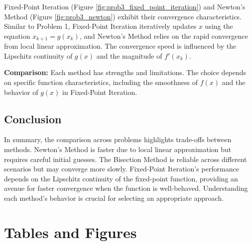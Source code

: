 \documentclass[12pt, letterpaper]{article}
\begin{document}
Fixed-Point Iteration (Figure \ref{fig:prob3_fixed_point_iteration}) and Newton's Method (Figure \ref{fig:prob3_newton}) exhibit their convergence characteristics. Similar to Problem 1, Fixed-Point Iteration iteratively updates \(x\) using the equation \(x_{k+1} = g(x_k)\), and Newton's Method relies on the rapid convergence from local linear approximation. The convergence speed is influenced by the Lipschitz continuity of \(g(x)\) and the magnitude of \(f'(x_k)\).

\textbf{Comparison:} Each method has strengths and limitations. The choice depends on specific function characteristics, including the smoothness of \(f(x)\) and the behavior of \(g(x)\) in Fixed-Point Iteration.

\subsection*{Conclusion}

In summary, the comparison across problems highlights trade-offs between methods. Newton's Method is faster due to local linear approximation but requires careful initial guesses. The Bisection Method is reliable across different scenarios but may converge more slowly. Fixed-Point Iteration's performance depends on the Lipschitz continuity of the fixed-point function, providing an avenue for faster convergence when the function is well-behaved. Understanding each method's behavior is crucial for selecting an appropriate approach.

\clearpage



\section{Tables and Figures}
\end{document}
